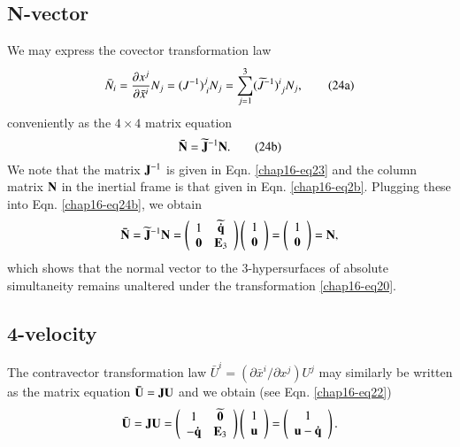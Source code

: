\subsection{N-vector}\label{chap16-sec6.2}

We may express the covector transformation law
\begin{equation*}
\bar{N}_i=\frac{\partial x^j}{\partial \bar{x}^i}N_j=(J^{-1})^j_{\;i} N_j=\sum_{j=1}^3 (\widetilde{J}^{-1})^i_{\;j} N_j,\tag{24a}\label{chap16-eq24a}
\end{equation*}
conveniently as the $4\times4$ matrix equation 
\begin{equation*}
\mathbf{\bar{N}}= \widetilde{\mathbf{J}}^{-1} \mathbf{N}. \tag{24b}\label{chap16-eq24b}
\end{equation*} 
We note that the matrix ${\mathbf{J}^{-1}}$ is given in Eqn. \eqref{chap16-eq23} and  the column matrix $\mathbf{N}$ in the inertial frame is that given in Eqn. \eqref{chap16-eq2b}.  Plugging these into Eqn. \eqref{chap16-eq24b}, we obtain 
\begin{equation}
\mathbf{\bar{N}}=\widetilde{\mathbf{J}}^{-1} \mathbf{N}= \left(\begin{array}{rc} 1 &  \widetilde{\mathbf{\dot{q}}} \\
\mathbf{0} & \mathbf{E}_3 \end{array}\right) 
\left(\begin{array}{rr} 
1\\\mathbf{0}\end{array}\right)
=\left(\begin{array}{c}  1\\{\mathbf{0}} \end{array}\right)
=\mathbf{N},\label{chap16-eq24}
\end{equation}
which shows that the normal vector to the 3-hypersurfaces of absolute simultaneity remains unaltered under the transformation \eqref{chap16-eq20}.

\subsection{4-velocity}\label{chap16-sec6.3}

The contravector transformation law  $\bar{U}^i=(\partial \bar{x}^i/\partial x^j) U^j$ may similarly be written as the matrix equation  $\mathbf{\bar{U}}=\mathbf{J} \mathbf{U}$ and we obtain (see Eqn. \eqref{chap16-eq22})
\begin{equation}
\bar{\mathbf{U}}=\mathbf{J}{\mathbf{U}}=\left(\begin{array}{cc} 1 & \widetilde{\mathbf{0}}\\
-\mathbf{\dot{q}} & \mathbf{E}_3 \end{array}\right)
\left(\begin{array}{c} 1 \\ \mathbf{u} \end{array}\right)=\left(\begin{array}{c} 
1 \\ \mathbf{u}-\mathbf{\dot{q}} \end{array}\right).\label{chap16-eq25}
\end{equation}

